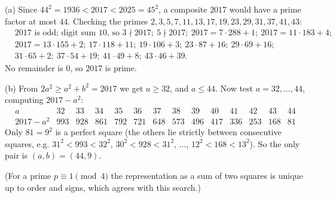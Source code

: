 (a) Since $44^2=1936<2017<2025=45^2$, a composite $2017$ would have a prime factor at most $44$. Checking the primes $2,3,5,7,11,13,17,19,23,29,31,37,41,43$:
\[
\begin{aligned}
&2017\text{ is odd; digit sum }10\text{, so }3\nmid2017;\ 5\nmid2017;\ 2017=7\cdot288+1;\ 2017=11\cdot183+4;\\
&2017=13\cdot155+2;\ 17\cdot118+11;\ 19\cdot106+3;\ 23\cdot87+16;\ 29\cdot69+16;\\
&31\cdot65+2;\ 37\cdot54+19;\ 41\cdot49+8;\ 43\cdot46+39 .
\end{aligned}
\]
No remainder is $0$, so $2017$ is prime.

(b) From $2a^2\ge a^2+b^2=2017$ we get $a\ge32$, and $a\le44$. Now test $a=32,\dots,44$, computing $2017-a^2$:
\[
\begin{array}{c|ccccccccccccc}
a&32&33&34&35&36&37&38&39&40&41&42&43&44\\\hline
2017-a^2&993&928&861&792&721&648&573&496&417&336&253&168&81
\end{array}
\]
Only $81=9^2$ is a perfect square (the others lie strictly between consecutive squares, e.g. $31^2<993<32^2$, $30^2<928<31^2$, $\dots$, $12^2<168<13^2$). So the only pair is $\boxed{(a,b)=(44,9)}$.

(For a prime $p\equiv1\pmod4$ the representation as a sum of two squares is unique up to order and signs, which agrees with this search.)
